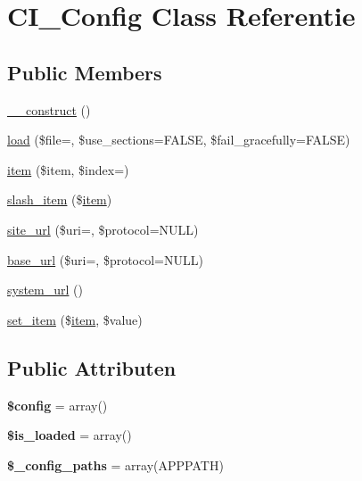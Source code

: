 \hypertarget{class_c_i___config}{}\section{C\+I\+\_\+\+Config Class Referentie}
\label{class_c_i___config}
\subsection*{Public Members}
\begin{DoxyCompactItemize}
\item 
\mbox{\hyperlink{class_c_i___config_a095c5d389db211932136b53f25f39685}{\+\_\+\+\_\+construct}} ()
\item 
\mbox{\hyperlink{class_c_i___config_a057a1ef8c730d6e00e3eeccbafe46f0d}{load}} (\$file=\textquotesingle{}\textquotesingle{}, \$use\+\_\+sections=F\+A\+L\+SE, \$fail\+\_\+gracefully=F\+A\+L\+SE)
\item 
\mbox{\hyperlink{class_c_i___config_a5fcaaca1b4d8a9d4c96311ce97d398c0}{item}} (\$item, \$index=\textquotesingle{}\textquotesingle{})
\item 
\mbox{\hyperlink{class_c_i___config_abead21ebddc51d12402b5320d531eb1f}{slash\+\_\+item}} (\$\mbox{\hyperlink{class_c_i___config_a5fcaaca1b4d8a9d4c96311ce97d398c0}{item}})
\item 
\mbox{\hyperlink{class_c_i___config_a3a12687251c502cb2d9c1e3f77ca56b8}{site\+\_\+url}} (\$uri=\textquotesingle{}\textquotesingle{}, \$protocol=N\+U\+LL)
\item 
\mbox{\hyperlink{class_c_i___config_a209120be5e55785e74609097123b40cf}{base\+\_\+url}} (\$uri=\textquotesingle{}\textquotesingle{}, \$protocol=N\+U\+LL)
\item 
\mbox{\hyperlink{class_c_i___config_a71e857f8dd38c230f1ce11bacf177ba8}{system\+\_\+url}} ()
\item 
\mbox{\hyperlink{class_c_i___config_a3cbd3bcacb546d42f5dd12213df48627}{set\+\_\+item}} (\$\mbox{\hyperlink{class_c_i___config_a5fcaaca1b4d8a9d4c96311ce97d398c0}{item}}, \$value)
\end{DoxyCompactItemize}
\subsection*{Public Attributen}
\begin{DoxyCompactItemize}
\item 
\mbox{\label{class_c_i___config_a49c7011be9c979d9174c52a8b83e5d8e}} 
{\bfseries \$config} = array()
\item 
\mbox{\label{class_c_i___config_a908e9ad52a5d1956d360689452f6bdbe}} 
{\bfseries \$is\+\_\+loaded} = array()
\item 
\mbox{\label{class_c_i___config_a5f47dbd2111b5bb6c91ece69fefebf26}} 
{\bfseries \$\+\_\+config\+\_\+paths} = array(A\+P\+P\+P\+A\+TH)
\end{DoxyCompactItemize}
